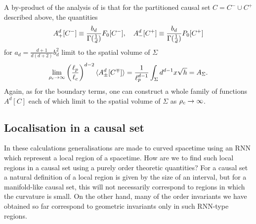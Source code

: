 A by-product of the analysis of \cite{bdjs} is that for the partitioned causal set $C=C^-\cup C^+$ described above, the quantities 
\begin{equation} 
A_+^d[C^-]\equiv \frac{b_d}{\Gamma(\frac{1}{d})}F_{0}[C^-], \quad A_-^d[C^+]\equiv \frac{b_d}{\Gamma(\frac{1}{d})}P_{0}[C^+]
\end{equation} 
for $a_d=\frac{d+1}{d(d+2)} b_d^2$ limit to the spatial volume of $\Sigma$
\begin{equation} 
\lim_{\rho_c \rightarrow \infty} \left(\frac{\ell_p}{\ell_c}\right)^{d-2} \langle {A_\pm^d[C^\mp]} \rangle = \frac{1}{\ell_p^{d-1}}\int_\Sigma
  d^{d-1} x \sqrt{h} = A_\Sigma. 
\end{equation} 
Again, as for the boundary terms, one can construct a  whole family of functions $A^d[C]$ each of 
which limit to the spatial volume of $\Sigma$ as $\rho_c \rightarrow \infty$.  
 






\subsection{Localisation in a causal set} 
\label{ssec:localisation} 

In these calculations generalisations are made to curved
spacetime using an RNN which represent a local region of a spacetime.  How are we to find such local regions in a
causal set using a purely order theoretic quantities?  For a causal set  a natural  definition of  a local region
is given by  the size of an interval, but for a manifold-like causal set, this will not necessarily correspond  to regions in
which the curvature is small. On the other hand, many of the order invariants we have obtained so far correspond to
geometric invariants only in such RNN-type regions.

